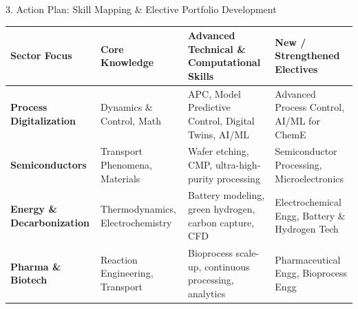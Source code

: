\documentclass[aspectratio=169, 10pt]{beamer}
\begin{document}
\begin{frame}{3. Action Plan: Skill Mapping \& Elective Portfolio Development}
  \scriptsize
  \renewcommand{\arraystretch}{1.3}
  \centering
  \begin{tabular}{L{2.6cm} L{3.0cm} L{4.6cm} L{3.8cm}}
    \toprule
    \textbf{Sector Focus} & \textbf{Core Knowledge} & \textbf{Advanced Technical \& Computational Skills} & \textbf{New / Strengthened Electives} \\
    \midrule
    \textbf{Process Digitalization} & Dynamics \& Control, Math & APC, Model Predictive Control, Digital Twins, AI/ML & Advanced Process Control, AI/ML for ChemE \\
    \addlinespace[4pt]
    \textbf{Semiconductors} & Transport Phenomena, Materials & Wafer etching, CMP, ultra-high-purity processing & Semiconductor Processing, Microelectronics \\
    \addlinespace[4pt]
    \textbf{Energy \& Decarbonization} & Thermodynamics, Electrochemistry & Battery modeling, green hydrogen, carbon capture, CFD & Electrochemical Engg, Battery \& Hydrogen Tech \\
    \addlinespace[4pt]
    \textbf{Pharma \& Biotech} & Reaction Engineering, Transport & Bioprocess scale-up, continuous processing, analytics & Pharmaceutical Engg, Bioprocess Engg \\
    \bottomrule
  \end{tabular}
\end{frame}
\end{document}
